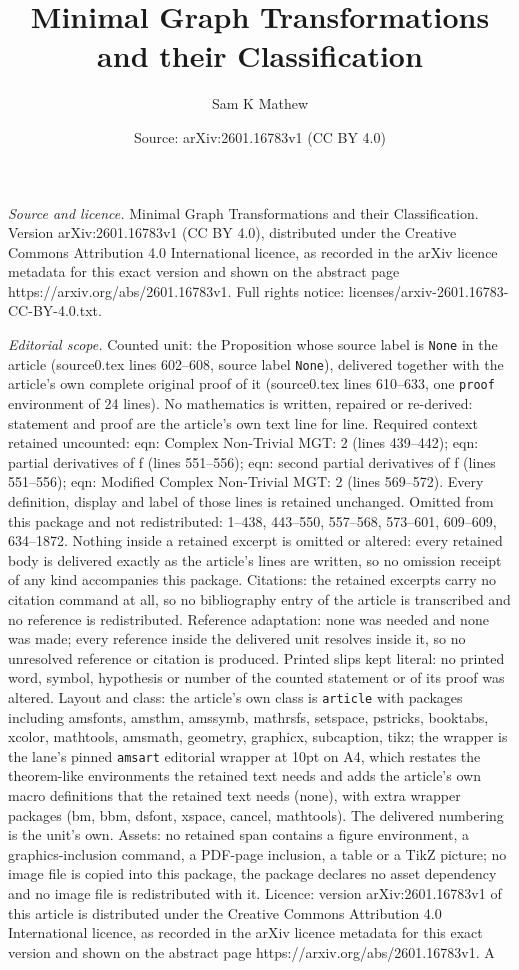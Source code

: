 \documentclass[10pt,a4paper]{amsart}
\title[Minimal Graph Transformations and their Classification]{Minimal Graph Transformations and their Classification}
\author{Sam K Mathew}
\date{Source: arXiv:2601.16783v1 (CC BY 4.0)}
\begin{document}
\maketitle

\noindent\emph{Source and licence.} Minimal Graph Transformations and their Classification. Version arXiv:2601.16783v1 (CC BY 4.0), distributed under the Creative Commons Attribution 4.0 International licence, as recorded in the arXiv licence metadata for this exact version and shown on the abstract page https://arxiv.org/abs/2601.16783v1. Full rights notice: licenses/arxiv-2601.16783-CC-BY-4.0.txt.\par\smallskip

\noindent\textit{Editorial scope.} Counted unit: the Proposition whose source label is \texttt{None} in the article (source0.tex lines 602--608, source label \texttt{None}), delivered together with the article's own complete original proof of it (source0.tex lines 610--633, one \texttt{proof} environment of 24 lines). No mathematics is written, repaired or re-derived: statement and proof are the article's own text line for line. Required context retained uncounted: eqn: Complex Non-Trivial MGT: 2 (lines 439--442); eqn: partial derivatives of f (lines 551--556); eqn: second partial derivatives of f (lines 551--556); eqn: Modified Complex Non-Trivial MGT: 2 (lines 569--572). Every definition, display and label of those lines is retained unchanged. Omitted from this package and not redistributed: 1--438, 443--550, 557--568, 573--601, 609--609, 634--1872. Nothing inside a retained excerpt is omitted or altered: every retained body is delivered exactly as the article's lines are written, so no omission receipt of any kind accompanies this package. Citations: the retained excerpts carry no citation command at all, so no bibliography entry of the article is transcribed and no reference is redistributed. Reference adaptation: none was needed and none was made; every reference inside the delivered unit resolves inside it, so no unresolved reference or citation is produced. Printed slips kept literal: no printed word, symbol, hypothesis or number of the counted statement or of its proof was altered. Layout and class: the article's own class is \texttt{article} with packages including amsfonts, amsthm, amssymb, mathrsfs, setspace, pstricks, booktabs, xcolor, mathtools, amsmath, geometry, graphicx, subcaption, tikz; the wrapper is the lane's pinned \texttt{amsart} editorial wrapper at 10pt on A4, which restates the theorem-like environments the retained text needs and adds the article's own macro definitions that the retained text needs (none), with extra wrapper packages (bm, bbm, dsfont, xspace, cancel, mathtools). The delivered numbering is the unit's own. Assets: no retained span contains a figure environment, a graphics-inclusion command, a PDF-page inclusion, a table or a TikZ picture; no image file is copied into this package, the package declares no asset dependency and no image file is redistributed with it. Licence: version arXiv:2601.16783v1 of this article is distributed under the Creative Commons Attribution 4.0 International licence, as recorded in the arXiv licence metadata for this exact version and shown on the abstract page https://arxiv.org/abs/2601.16783v1. A 
\end{document}
